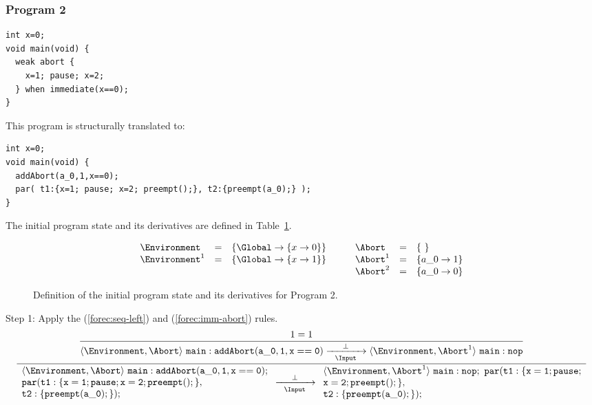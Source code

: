\subsubsection{Program 2}
\begin{lstlisting}[style=snippet]
int x=0;
void main(void) {
  weak abort {
    x=1; pause; x=2;
  } when immediate(x==0);
}
\end{lstlisting}
This program is structurally translated to:
\begin{lstlisting}[style=snippet]
int x=0;
void main(void) {
  addAbort(a_0,1,x==0);
  par( t1:{x=1; pause; x=2; preempt();}, t2:{preempt(a_0);} );
}
\end{lstlisting}
The initial program state and its derivatives are defined 
in Table~\ref{figure:forec_program_2}.
\newline

\begin{figure}
	\centering
	$$\begin{array}{l l l l l l l}
		 \Environment		&=& \lbrace \Global \to \lbrace x \to 0	\rbrace \rbrace	& \qquad \Abort		&=& \lbrace ~ \rbrace			\\
		 \Environment^1		&=& \lbrace \Global \to \lbrace x \to 1	\rbrace \rbrace & \qquad \Abort^1	&=& \lbrace a\_0 \to 1 \rbrace	\\
		 					& &														& \qquad \Abort^2	&=& \lbrace a\_0 \to 0 \rbrace	\\
	\end{array}$$
	
	\caption{Definition of the initial program state and its derivatives for Program 2.}
	\label{figure:forec_program_2}
\end{figure}

\noindent
Step 1: Apply the (\ref{forec:seq-left}) and (\ref{forec:imm-abort}) rules. 
\begin{equation*}
	\frac{
		\dfrac{
				1 = 1
			}{
				\langle \Environment, \Abort \rangle ~ \mathtt{main: addAbort(a\_0, 1, x==0)}
					\xrightarrow[~~\Input~~]{\bot} 
				\langle \Environment, \Abort^1 \rangle ~ \mathtt{main: nop}
			}
		}{
			\begin{array}{l}
				\langle \Environment, \Abort \rangle ~ \mathtt{main: addAbort(a\_0, 1, x==0);}		\\
				\mathtt{par( t1:\{x=1; pause; x=2; preempt();\},}									\\
				\mathtt{t2:\{preempt(a\_0);\} );}													\\
			\end{array}
				\xrightarrow[~~\Input~~]{\bot} 
			\begin{array}{l}
				\langle \Environment, \Abort^1 \rangle ~ \mathtt{main: nop;~par( t1:\{x=1; pause;}	\\
				\mathtt{x=2; preempt();\},}															\\
				\mathtt{t2:\{preempt(a\_0);\} );}	
			\end{array}
		}
\end{equation*}

